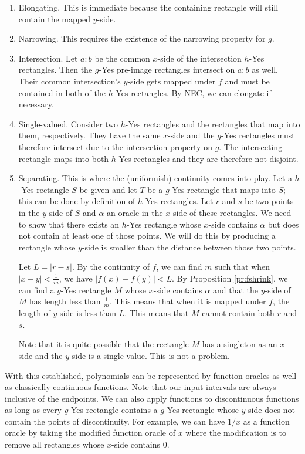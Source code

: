 \documentclass[12pt]{article}
\theoremstyle{remark}
\begin{document}
\begin{enumerate} 
\item Elongating. This is immediate because the containing rectangle will still contain the mapped $y$-side. 
\item Narrowing. This requires the existence of the narrowing property for $g$. 
\item Intersection. Let $a:b$ be the common $x$-side of the intersection $h$-Yes rectangles. Then the $g$-Yes pre-image rectangles intersect on $a:b$ as well. Their common intersection's $y$-side gets mapped under $f$ and must be contained in both of the $h$-Yes rectangles. By NEC, we can elongate if necessary. 
\item Single-valued. Consider two $h$-Yes rectangles and the rectangles that map into them, respectively. They have the same $x$-side and the $g$-Yes rectangles must therefore intersect due to the intersection property on $g$. The intersecting rectangle maps into both $h$-Yes rectangles and they are therefore not disjoint.  

\item Separating. This is where the (uniformish) continuity comes into play. Let a $h$-Yes rectangle $S$ be given and let $T$ be a $g$-Yes rectangle that maps into $S$; this can be done by definition of $h$-Yes rectangles. Let $r$ and $s$ be two points in the $y$-side of $S$ and $\alpha$ an oracle in the $x$-side of these rectangles. We need to show that there exists an $h$-Yes rectangle whose $x$-side contains $\alpha$ but does not contain at least one of those points. We will do this by producing a rectangle whose $y$-side is smaller than the distance between those two points. 

Let $L = |r-s|$. By the continuity of $f$, we can find $m$ such that when $|x-y| < \frac{1}{m}$, we have $|f(x) - f(y)| < L$. By Proposition \ref{pr:fshrink}, we can find a $g$-Yes rectangle $M$ whose $x$-side contains $\alpha$ and that the $y$-side of $M$ has length less than $\frac{1}{m}$. This means that when it is mapped under $f$, the length of $y$-side is less than $L$. This means that $M$ cannot contain both $r$ and $s$.

Note that it is quite possible that the rectangle $M$ has a singleton as an $x$-side and the $y$-side is a single value. This is not a problem. 

\end{enumerate}

With this established, polynomials can be represented by function oracles as well as classically continuous functions. Note that our input intervals are always inclusive of the endpoints. We can also apply functions to discontinuous functions as long as every $g$-Yes rectangle contains a $g$-Yes rectangle whose $y$-side does not contain the points of discontinuity. For example, we can have $1/x$ as a function oracle by taking the modified function oracle of $x$ where the modification is to remove all rectangles whose $x$-side contains 0. 
\end{document}
